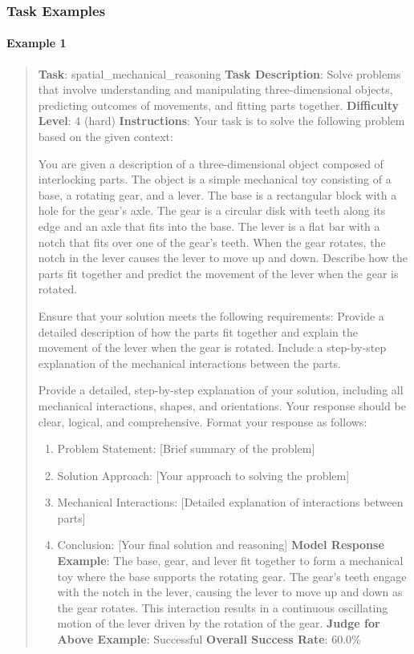 \documentclass[fleqn,10pt]{wlscirep}
\providecommand{\tightlist}{%
  \setlength{\itemsep}{0pt}\setlength{\parskip}{0pt}}
\begin{document}
\hypertarget{task-examples-4}{%
\subsubsection{Task Examples}\label{task-examples-4}}

\hypertarget{example-1-4}{%
\paragraph{Example 1}\label{example-1-4}}

\begin{quote}
\textbf{Task}: spatial\_mechanical\_reasoning \textbf{Task Description}:
Solve problems that involve understanding and manipulating
three-dimensional objects, predicting outcomes of movements, and fitting
parts together. \textbf{Difficulty Level}: 4 (hard)
\textbf{Instructions}: Your task is to solve the following problem based
on the given context:

You are given a description of a three-dimensional object composed of
interlocking parts. The object is a simple mechanical toy consisting of
a base, a rotating gear, and a lever. The base is a rectangular block
with a hole for the gear's axle. The gear is a circular disk with teeth
along its edge and an axle that fits into the base. The lever is a flat
bar with a notch that fits over one of the gear's teeth. When the gear
rotates, the notch in the lever causes the lever to move up and down.
Describe how the parts fit together and predict the movement of the
lever when the gear is rotated.

Ensure that your solution meets the following requirements: Provide a
detailed description of how the parts fit together and explain the
movement of the lever when the gear is rotated. Include a step-by-step
explanation of the mechanical interactions between the parts.

Provide a detailed, step-by-step explanation of your solution, including
all mechanical interactions, shapes, and orientations. Your response
should be clear, logical, and comprehensive. Format your response as
follows:

\begin{enumerate}
\def\labelenumi{\arabic{enumi}.}
\tightlist
\item
  Problem Statement: {[}Brief summary of the problem{]}
\item
  Solution Approach: {[}Your approach to solving the problem{]}
\item
  Mechanical Interactions: {[}Detailed explanation of interactions
  between parts{]}
\item
  Conclusion: {[}Your final solution and reasoning{]} \textbf{Model
  Response Example}: The base, gear, and lever fit together to form a
  mechanical toy where the base supports the rotating gear. The gear's
  teeth engage with the notch in the lever, causing the lever to move up
  and down as the gear rotates. This interaction results in a continuous
  oscillating motion of the lever driven by the rotation of the gear.
  \textbf{Judge for Above Example}: Successful \textbf{Overall Success
  Rate}: 60.0\%
\end{enumerate}
\end{quote}
\end{document}
